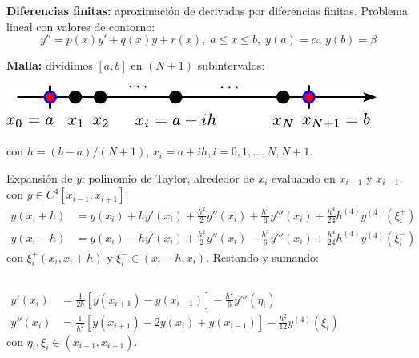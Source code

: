 \documentclass[9pt, aspectratio=169]{beamer}
\begin{document}
\begin{frame}
\textbf{Diferencias finitas:} aproximación de derivadas por diferencias finitas. Problema lineal con valores de contorno:
\begin{equation} y'' = p(x) y' + q(x) y + r(x), \; a \leq x \leq b, \; y(a) = \alpha, \, y(b) = \beta \label{eq:plineal} \end{equation} \pause
\vspace{-1.0em}

\textbf{Malla:} dividimos $[a, b]$ en $(N + 1)$ subintervalos:
\begin{center}
    \includegraphics[scale=1.0]{figs/grilla-1d.pdf}
\end{center}
con $h = (b-a)/(N+1)$, $x_i = a + ih, i = 0, 1, \ldots, N, N+1$. \pause

Expansión de $y$: polinomio de Taylor, alrededor de $x_i$ evaluando en $x_{i+1}$ y $x_{i-1}$, con $y \in C^4[x_{i-1}, x_{i+1}]$:
\begin{align*}
    y(x_i+h) &= y(x_i) + h y'(x_i) + \frac{h^2}{2} y''(x_i) + \frac{h^3}{6} y'''(x_i) + \frac{h^4}{24} h^{(4)} y^{(4)}(\xi_i^+) \\
    y(x_i-h) &= y(x_i) - h y'(x_i) + \frac{h^2}{2} y''(x_i) - \frac{h^3}{6} y'''(x_i) + \frac{h^4}{24} h^{(4)} y^{(4)}(\xi_i^-) 
\end{align*}
con $\xi_i^+ (x_i, x_i+h)$ y $\xi_i^- \in (x_i - h, x_i)$. Restando y sumando: \vspace{-0.5em}
\begin{columns}
\begin{equation}
    \begin{split}
    y'(x_i) &=\frac{1}{2h} [y(x_{i+1}) - y(x_{i-1})] - \frac{h^2}{6} y'''(\eta_i) \\
y''(x_i) &= \frac{1}{h^2} [ y(x_{i+1}) - 2 y(x_i) + y(x_{i-1})] - \frac{h^2}{12} y^{(4)}(\xi_i)
\end{split}
\label{eq:diffin}
\end{equation}
con $\eta_i, \xi_i \in (x_{i-1}, x_{i+1})$.
\end{columns}
\end{frame}
\end{document}
